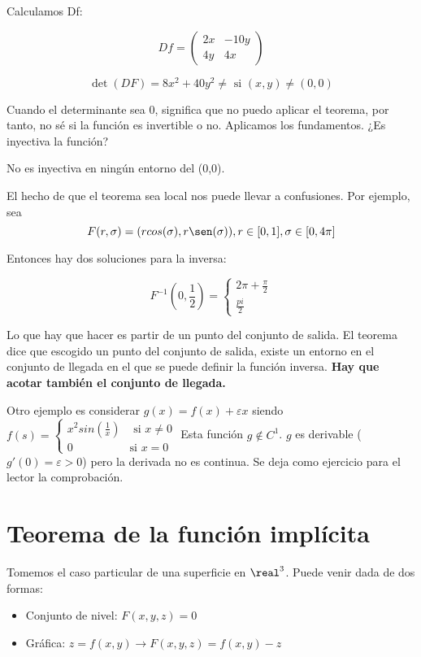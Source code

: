 Calculamos Df:

$$Df = \begin{pmatrix}
        2x&-10y\\
        4y & 4x 
       \end{pmatrix}
$$

$$\det(DF) = 8x^2 + 40y^2 \neq \text{ si } (x,y) \neq (0,0)$$

Cuando el determinante sea 0, significa que no puedo aplicar el teorema, por tanto, no sé si la función es invertible o no. Aplicamos los fundamentos. ¿Es inyectiva la función?

No es inyectiva en ningún entorno del (0,0).

El hecho de que el teorema sea local nos puede llevar a confusiones. Por ejemplo, sea \[ F (r,\sigma) = (rcos(\sigma),r\sen(\sigma)), r \in [0,1], \sigma \in [0,4\pi]\]

Entonces hay dos soluciones para la inversa:

\[ F^{-1} (0,\frac{1}{2}) = \left\{\begin{matrix}2\pi+\frac{\pi}{2}\\\frac{pi}{2}\end{matrix}\right. \]

Lo que hay que hacer es partir de un punto del conjunto de salida. El teorema dice que escogido un punto del conjunto de salida, existe un entorno en el conjunto de llegada en el que se puede definir la función inversa. \textbf{Hay que acotar también el conjunto de llegada.}

Otro ejemplo es considerar  $g(x) = f(x) + \varepsilon x$ siendo $f(s) =\left\{\begin{matrix}x^2sin\left(\frac{1}{x}\right)& \text{ si } x\neq0\\0 &\text{si } x=0\end{matrix}\right.$
Esta función $g \notin C^1$. $g$ es derivable ($g'(0) = \varepsilon>0$) pero la derivada no es continua. Se deja como ejercicio para el lector la comprobación.      

\section{Teorema de la función implícita}

Tomemos el caso particular de una superficie en $\real^3$. Puede venir dada de dos formas:
\begin{itemize}
 \item Conjunto de nivel: $F(x,y,z) = 0$
 \item Gráfica: $z=f(x,y) \rightarrow F(x,y,z) = f(x,y)-z$
\end{itemize}


